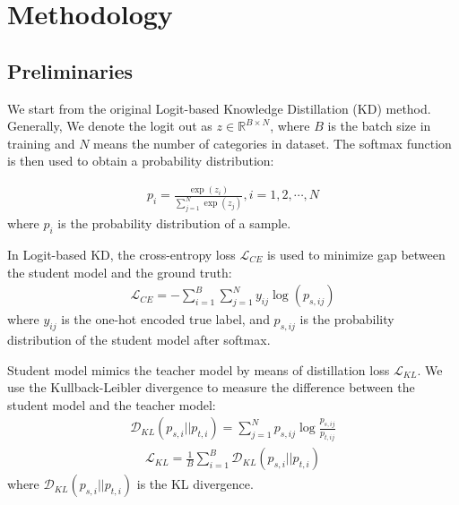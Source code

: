 \section{Methodology}
\label{sec:methodology}
\subsection{Preliminaries}
\label{sec:KD}
We start from the original Logit-based Knowledge Distillation (KD) method. Generally, We denote the logit out as $z \in \mathbb{R}^{B\times N}$, where $B$ is the batch size in training and $N$ means the number of categories in dataset. The softmax function is then used to obtain a probability distribution:



\begin{equation}
    \begin{aligned}
        p_{i} = \frac{\exp(z_{i})}{\sum_{j = 1}^{N}\exp(z_{j})}, i = 1,2,\cdots,N
    \end{aligned}
\end{equation}
where $p_{i}$ is the probability distribution of a sample.

In Logit-based KD, the cross-entropy loss $\mathcal{L}_{CE}$ is used to minimize gap between the student model and the ground truth: 
\begin{equation}
    \begin{aligned}
        \mathcal{L}_{CE}=-\sum_{i = 1}^{B}\sum_{j = 1}^{N}y_{ij}\log(p_{s,ij})
    \end{aligned}
\end{equation}
where $y_{ij}$ is the one-hot encoded true label, and $p_{s,ij}$ is the probability distribution of the student model after softmax.

Student model mimics the teacher model by means of distillation loss $\mathcal{L}_{KL}$. We use the Kullback-Leibler divergence to measure the difference between the student model and the teacher model: 
\begin{equation}
    \begin{aligned}
        \mathcal{D}_{KL}(p_{s,i}||p_{t,i})=\sum_{j = 1}^{N}p_{s,ij}\log\frac{p_{s,ij}}{p_{t,ij}}
    \end{aligned}
\end{equation}
\begin{equation}
    \begin{aligned}
        \mathcal{L}_{KL}=\frac{1}{B}\sum_{i = 1}^{B}\mathcal{D}_{KL}(p_{s,i}||p_{t,i})
    \end{aligned}
\end{equation}
where $\mathcal{D}_{KL}(p_{s,i}||p_{t,i})$ is the KL divergence. 

